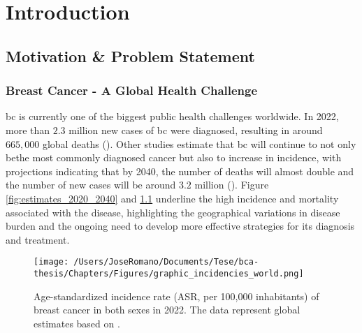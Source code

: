 
%

\chapter{Introduction}
\label{cha:introduction}

\section{Motivation \& Problem Statement}
\label{sec:motivation+problem-statement}
\subsection{Breast Cancer - A Global Health Challenge}

\gls{bc} is currently one of the biggest public health challenges worldwide. In
2022, more than $2.3$ million new cases of \gls{bc} were diagnosed, resulting in
around $665,\!000$ global deaths (\textcite{bcaData2024_bray}). Other studies
estimate that \gls{bc} will continue to not only bethe most commonly diagnosed
cancer but also to increase in incidence, with projections indicating that by
2040, the number of deaths will almost double and the number of new cases will
be around $3.2$ million (\textcite{bca_data_Arnold2022Current}). Figure
\ref{fig:estimates_2020_2040} and \ref{fig:graphic_incidencies_world}
underline the high incidence and mortality associated with the disease,
highlighting the geographical variations in disease burden and the ongoing need
to develop more effective strategies for its diagnosis and treatment.

\begin{figure}[h!]
  \centering
  \texttt{[image: /Users/JoseRomano/Documents/Tese/bca-thesis/Chapters/Figures/graphic\_incidencies\_world.png]}
  \caption{Age-standardized incidence rate (ASR, per 100,000 inhabitants) of breast cancer in both sexes in 2022.
    The data represent global estimates based on \textcite{GLOBOCAN2022}.}
  \label{fig:graphic_incidencies_world}
\end{figure}

